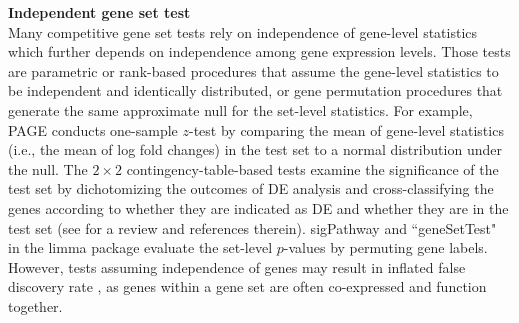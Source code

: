 \documentclass[a4,center,fleqn]{NAR}
\newcommand{\gen}{geneSetTest}
\begin{document}
	\textbf{Independent gene set test} \\
	Many competitive gene set tests rely on independence of gene-level statistics which further depends
	on independence among gene expression levels. Those tests are parametric or rank-based procedures
	that assume the gene-level statistics to be independent and identically distributed, or gene
	permutation procedures that generate the same approximate null for the set-level statistics. For
	example, PAGE  \citep{kim2005page} conducts one-sample $z$-test by comparing the mean of gene-level
	statistics (i.e., the mean of log fold changes) in the test set to a normal distribution under the
	null. The $2\times 2$ contingency-table-based tests examine the significance of the test set by
	dichotomizing the outcomes of DE analysis and cross-classifying the genes according to whether they
	are indicated as DE and whether they are in the test set (see \cite{huang2009bioinformatics} for a
	review and references therein). sigPathway \citep{tian2005discovering} and ``\gen" in the limma
	package \citep{Smyth2004moderated} evaluate the set-level $p$-values by permuting gene labels.
	However, tests assuming independence of genes may result in inflated false discovery rate
	\citep{efron2007testing,goeman2007analyzing, gatti2010heading,wu2012camera,yaari2013quantitative},
	as genes within a gene set are often co-expressed and function together.
	
\end{document}
